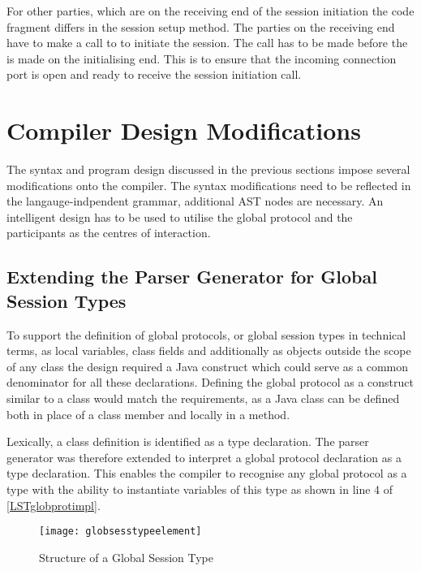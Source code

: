 For other parties, which are on the receiving end of the session initiation the code fragment differs in the session setup method. The parties on the receiving end have to make a call to  to initiate the session. The call has to be made before the  is made on the initialising end. This is to ensure that the incoming connection port is open and ready to receive the session initiation call.

\section{Compiler Design Modifications}

The syntax and program design discussed in the previous sections impose several modifications onto the compiler. The syntax modifications need to be reflected in the langauge-indpendent grammar, additional AST nodes are necessary. An intelligent design has to be used to utilise the global protocol and the participants as the centres of interaction.

\subsection{Extending the Parser Generator for Global Session Types}

To support the definition of global protocols, or global session types in technical terms, as local variables, class fields and additionally as objects outside the scope of any class the design required a Java construct which could serve as a common denominator for all these declarations. Defining the global protocol as a construct similar to a class would match the requirements, as a Java class can be defined both in place of a class member and locally in a method. 

Lexically, a class definition is identified as a type declaration. The parser generator was therefore extended to interpret a global protocol declaration as a type declaration. This enables the compiler to recognise any global protocol as a type with the ability to instantiate variables of this type as shown in line 4 of \autoref{LSTglobprotimpl}.

\begin{figure}[htb]
\begin{center}
\texttt{[image: globsesstypeelement]}
\caption{Structure of a Global Session Type}
\label{fig:globsesstypelement}
\end{center}
\end{figure}


